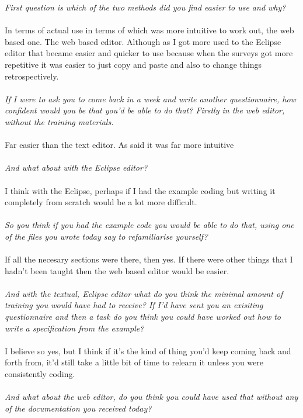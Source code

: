 \textit{First question is which of the two methods did you find easier to use and why?}
\\
\\
In terms of actual use in terms of which was more intuitive to work out, the web based one. The web based editor. Although as I got more used to the Eclipse editor that became easier and quicker to use because when the surveys got more repetitive it was easier to just copy and paste and also to change things retrospectively.
\\
\\
\textit{If I were to ask you to come back in a week and write another questionnaire, how confident would you be that you'd be able to do that? Firstly in the web editor, without the training materials.}
\\
\\
Far easier than the text editor. As said it was far more intuitive
\\
\\
\textit{And what about with the Eclipse editor?}
\\
\\
I think with the Eclipse, perhaps if I had the example coding but writing it completely from scratch would be a lot more difficult.
\\
\\
\textit{So you think if you had the example code you would be able to do that, using one of the files you wrote today say to refamiliarise yourself?}
\\
\\
If all the necesary sections were there, then yes. If there were other things that I hadn't been taught then the web based editor would be easier.
\\
\\
\textit{And with the textual, Eclipse editor what do you think the minimal amount of training you would have had to receive? If I'd have sent you an exisiting questionnaire and then a task do you think you could have worked out how to write a specification from the example?}
\\
\\
I believe so yes, but I think if it's the kind of thing you'd keep coming back and forth from, it'd still take a little bit of time to relearn it unless you were consistently coding.
\\
\\
\textit{And what about the web editor, do you think you could have used that without any of the documentation you received today?}
